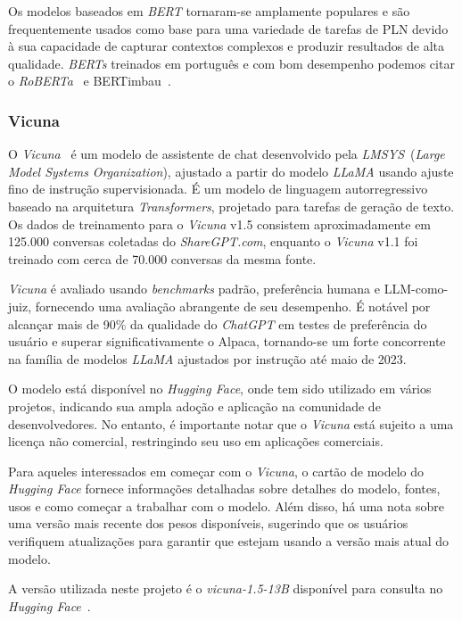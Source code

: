 Os modelos baseados em \textit{BERT} tornaram-se amplamente populares e são frequentemente usados como base para uma variedade de tarefas de PLN devido à sua capacidade de capturar contextos complexos e produzir resultados de alta qualidade. \textit{BERTs} treinados em português e com bom desempenho podemos citar o \textit{RoBERTa}~\cite{liu2019roberta} e BERTimbau~\cite{souza2020bertimbau}.

\subsubsection{Vicuna}
\label{cap:fund_teorica:sec:modelos:subsec:vicuna}

O \textit{Vicuna}~\cite{vicuna2023} é um modelo de assistente de chat desenvolvido pela \textit{LMSYS}~(\textit{Large Model Systems Organization}), ajustado a partir do modelo \textit{LLaMA} usando ajuste fino de instrução supervisionada. É um modelo de linguagem autorregressivo baseado na arquitetura \textit{Transformers}, projetado para tarefas de geração de texto. Os dados de treinamento para o \textit{Vicuna} v1.5 consistem aproximadamente em 125.000 conversas coletadas do \textit{ShareGPT.com}, enquanto o \textit{Vicuna} v1.1 foi treinado com cerca de 70.000 conversas da mesma fonte.

\textit{Vicuna} é avaliado usando \textit{benchmarks} padrão, preferência humana e LLM-como-juiz, fornecendo uma avaliação abrangente de seu desempenho. É notável por alcançar mais de 90\% da qualidade do \textit{ChatGPT} em testes de preferência do usuário e superar significativamente o Alpaca, tornando-se um forte concorrente na família de modelos \textit{LLaMA} ajustados por instrução até maio de 2023.

O modelo está disponível no \textit{Hugging Face}, onde tem sido utilizado em vários projetos, indicando sua ampla adoção e aplicação na comunidade de desenvolvedores. No entanto, é importante notar que o \textit{Vicuna} está sujeito a uma licença não comercial, restringindo seu uso em aplicações comerciais.

Para aqueles interessados em começar com o \textit{Vicuna}, o cartão de modelo do \textit{Hugging Face} fornece informações detalhadas sobre detalhes do modelo, fontes, usos e como começar a trabalhar com o modelo. Além disso, há uma nota sobre uma versão mais recente dos pesos disponíveis, sugerindo que os usuários verifiquem atualizações para garantir que estejam usando a versão mais atual do modelo.

A versão utilizada neste projeto é o \textit{vicuna-1.5-13B} disponível para consulta no \textit{Hugging Face}~\cite{vicuna1513b}.

